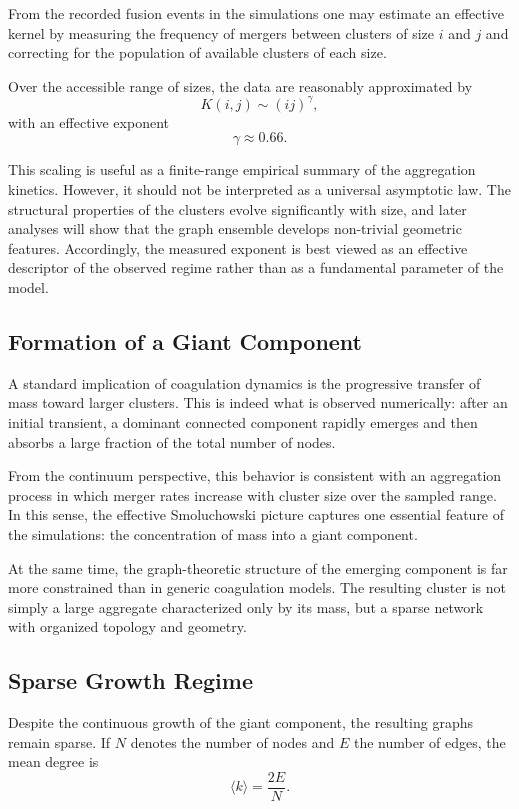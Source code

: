 \documentclass[11pt]{article}
\begin{document}
From the recorded fusion events in the simulations one may estimate an effective kernel by measuring the frequency of mergers between clusters of size $i$ and $j$ and correcting for the population of available clusters of each size.

Over the accessible range of sizes, the data are reasonably approximated by
\[
K(i,j)\sim (ij)^{\gamma},
\]
with an effective exponent
\[
\gamma \approx 0.66.
\]

This scaling is useful as a finite-range empirical summary of the aggregation kinetics.
However, it should not be interpreted as a universal asymptotic law.
The structural properties of the clusters evolve significantly with size, and later analyses will show that the graph ensemble develops non-trivial geometric features.
Accordingly, the measured exponent is best viewed as an effective descriptor of the observed regime rather than as a fundamental parameter of the model.

\subsection{Formation of a Giant Component}

A standard implication of coagulation dynamics is the progressive transfer of mass toward larger clusters.
This is indeed what is observed numerically: after an initial transient, a dominant connected component rapidly emerges and then absorbs a large fraction of the total number of nodes.

From the continuum perspective, this behavior is consistent with an aggregation process in which merger rates increase with cluster size over the sampled range.
In this sense, the effective Smoluchowski picture captures one essential feature of the simulations: the concentration of mass into a giant component.

At the same time, the graph-theoretic structure of the emerging component is far more constrained than in generic coagulation models.
The resulting cluster is not simply a large aggregate characterized only by its mass, but a sparse network with organized topology and geometry.

\subsection{Sparse Growth Regime}

Despite the continuous growth of the giant component, the resulting graphs remain sparse.
If $N$ denotes the number of nodes and $E$ the number of edges, the mean degree is
\[
\langle k\rangle = \frac{2E}{N}.
\]
\end{document}
